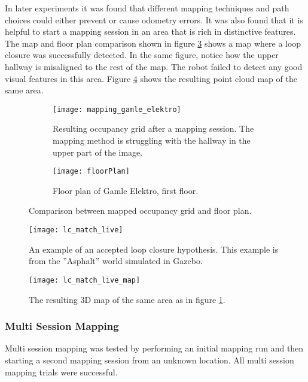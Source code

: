 In later experiments it was found that different mapping techniques and path choices could either prevent or cause odometry errors. It was also found that it is helpful to start a mapping session in an area that is rich in distinctive features. The map and floor plan comparison shown in figure \ref{fig:comparison} shows a map where a loop closure was successfully detected. In the same figure, notice how the upper hallway is misaligned to the rest of the map. The robot failed to detect any good visual features in this area. Figure \ref{fig:lc_match_live} shows the resulting point cloud map of the same area.

\begin{figure}
	\centering
	\begin{subfigure}[b]{1\textwidth}
		\texttt{[image: mapping\_gamle\_elektro]}
		\caption{Resulting occupancy grid after a mapping session. The mapping  method is struggling with the  hallway in the upper part of the image.}
		\label{fig:mapping_gamle_elektro}
	\end{subfigure}
	\begin{subfigure}[b]{1\textwidth}
		\texttt{[image: floorPlan]}
		\caption{Floor plan of Gamle Elektro, first floor.}
		\label{fig:floorPlan}
	\end{subfigure}
	\caption{Comparison between mapped occupancy grid and floor plan.}\label{fig:comparison}
\end{figure}



\begin{figure}[h]
	\centering
	\texttt{[image: lc\_match\_live]}
	\caption{An example of an accepted loop closure hypothesis. This example is from the ''Asphalt'' world simulated in Gazebo.}
	\label{fig:lc_match_live}
\end{figure}

\begin{figure}[p]
	\centering
	\texttt{[image: lc\_match\_live\_map]}
	\caption{The resulting 3D map of the same area as in figure \ref{fig:mapping_gamle_elektro}.}
	\label{fig:lc_match_live_map}
\end{figure}

\subsubsection{Multi Session Mapping}

Multi session mapping was tested by performing an initial mapping run and then starting a second mapping session from an unknown location. All multi session mapping trials were successful.

